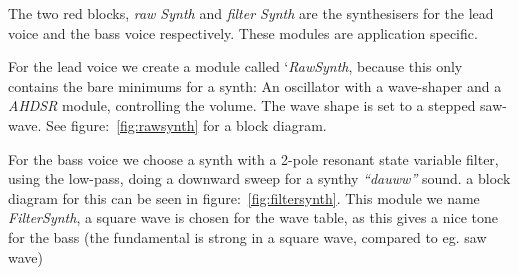 
The two red blocks, \emph{raw Synth} and \emph{filter Synth} are the
synthesisers for the lead voice and the bass voice respectively. These modules
are application specific.

For the lead voice we create a module called `\emph{RawSynth}, because this only
contains the bare minimums for a synth: An oscillator with a wave-shaper and a
\emph{AHDSR} module, controlling the volume. The wave shape is set to a stepped
saw-wave. See figure:~\ref{fig:rawsynth} for a block diagram.


For the bass voice we choose a synth with a 2-pole resonant state variable
filter, using the low-pass, doing a downward sweep for a synthy \emph{``dauww''}
sound. a block diagram for this can be seen in figure:~\ref{fig:filtersynth}.
This module we name \emph{FilterSynth}, a square wave is chosen for the
wave table, as this gives a nice tone for the bass (the fundamental is strong
in a square wave, compared to eg. saw wave)


